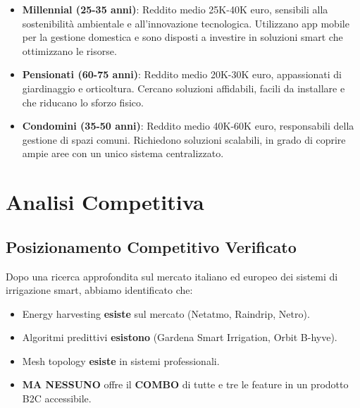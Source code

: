 \documentclass[11pt,a4paper]{report}
\begin{document}
\begin{itemize}
\item {\bf Millennial (25-35 anni)}: Reddito medio 25K-40K euro, sensibili alla sostenibilità ambientale e all'innovazione tecnologica. Utilizzano app mobile per la gestione domestica e sono disposti a investire in soluzioni smart che ottimizzano le risorse.
\item {\bf Pensionati (60-75 anni)}: Reddito medio 20K-30K euro, appassionati di giardinaggio e orticoltura. Cercano soluzioni affidabili, facili da installare e che riducano lo sforzo fisico.
\item {\bf Condomini (35-50 anni)}: Reddito medio 40K-60K euro, responsabili della gestione di spazi comuni. Richiedono soluzioni scalabili, in grado di coprire ampie aree con un unico sistema centralizzato.
\end{itemize}

\section{Analisi Competitiva}
\subsection{Posizionamento Competitivo Verificato}
Dopo una ricerca approfondita sul mercato italiano ed europeo dei sistemi di irrigazione smart, abbiamo identificato che:

\begin{itemize}
\item Energy harvesting {\bf esiste} sul mercato (Netatmo, Raindrip, Netro).
\item Algoritmi predittivi {\bf esistono} (Gardena Smart Irrigation, Orbit B-hyve).
\item Mesh topology {\bf esiste} in sistemi professionali.
\item {\bf MA NESSUNO} offre il {\bf COMBO} di tutte e tre le feature in un prodotto B2C accessibile.
\end{itemize}
\end{document}
